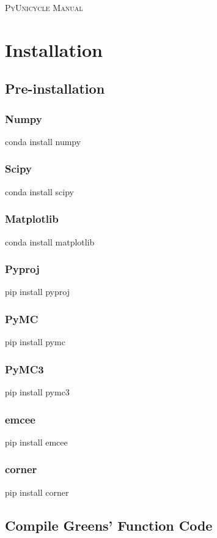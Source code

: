 \documentclass[UTF8,a4paper]{report}
\begin{document}
\pagestyle{empty}
\begin{center}
\Large\scshape PyUnicycle Manual
\end{center}



\chapter{Installation}
\section{Pre-installation}
\subsection{Numpy}
conda install numpy

\subsection{Scipy}
conda install scipy

\subsection{Matplotlib}
conda install matplotlib

\subsection{Pyproj}
pip install pyproj

\subsection{PyMC}
pip install pymc

\subsection{PyMC3}
pip install pymc3

\subsection{emcee}
pip install emcee

\subsection{corner}
pip install corner

\section{Compile Greens' Function Code}
\end{document}
